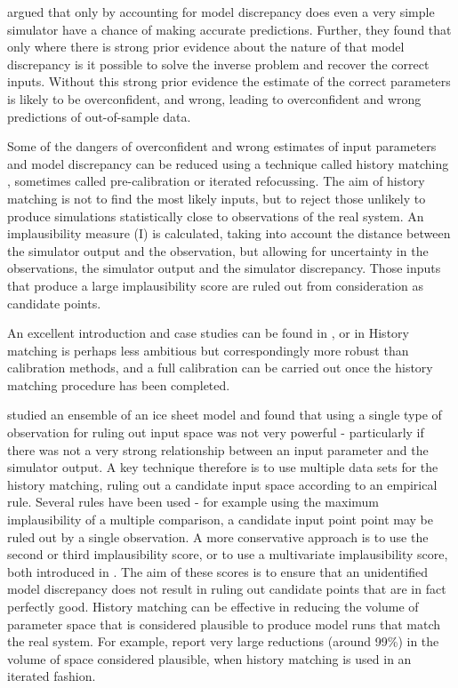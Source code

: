 \documentclass[gmd, manuscript]{copernicus}
\begin{document}
\cite{brynjarsdottir2014learning} argued that only by accounting for model discrepancy does even a very simple simulator have a chance of making accurate predictions. Further, they found that only where there is strong prior evidence about the nature of that model discrepancy is it possible to solve the inverse problem and recover the correct inputs. Without this strong prior evidence the estimate of the correct parameters is likely to be overconfident, and wrong, leading to overconfident and wrong predictions of out-of-sample data.

Some of the dangers of overconfident and wrong estimates of input parameters and model discrepancy can be reduced using a technique called history matching \citep{craig1996strategies}, sometimes called pre-calibration or iterated refocussing. The aim of history matching is not to find the most likely inputs, but to reject those unlikely to produce simulations statistically close to observations of the real system. An implausibility measure (I) is calculated, taking into account the distance between the simulator output and the observation, but allowing for uncertainty in the observations, the simulator output and the simulator discrepancy. Those inputs that produce a large implausibility score are ruled out from consideration as candidate points.

An excellent introduction and case studies can be found in \cite{andrianakis2015bayesian}, or in \cite{vernon2010galaxy} History matching is perhaps less ambitious but correspondingly more robust than calibration methods, and a full calibration can be carried out once the history matching procedure has been completed.

\citep{mcneall2013potential} studied an ensemble of an ice sheet model and found that using a single type of observation for ruling out input space was not very powerful - particularly if there was not a very strong relationship between an input parameter and the simulator output.  A key technique therefore is to use multiple data sets for the history matching, ruling out a candidate input space according to an empirical rule. Several rules have been used - for example using the maximum implausibility of a multiple comparison, a candidate input point point may be ruled out by a single observation. A more conservative approach is to use the second or third implausibility score, or to use a multivariate implausibility score, both introduced in \cite{vernon2010galaxy}. The aim of these scores is to ensure that an unidentified model discrepancy does not result in ruling out candidate points that are in fact perfectly good. History matching can be effective in reducing the volume of parameter space that is considered plausible to produce model runs that match the real system. For example, \cite{williamson2015identifying} report very large reductions (around 99\%) in the volume of space considered plausible, when history matching is used in an iterated fashion.
\end{document}
